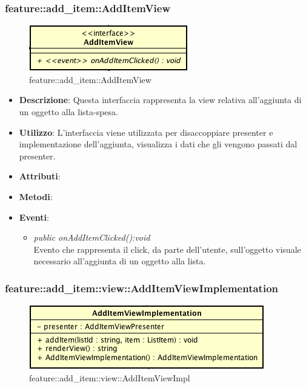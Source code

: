 \subsubsection{feature::add\_item::AddItemView}

\label{feature::add_item::AddItemView}
\begin{figure}[H]
	\centering
	\includegraphics[scale=0.5]{Sezioni/SottosezioniST/img/app/AddItemView.png}
	\caption{feature::add\_item::AddItemView}
\end{figure}

\begin{itemize}
\item \textbf{Descrizione}: Questa interfaccia rappresenta la view relativa all'aggiunta di un oggetto alla lista-spesa.
\item \textbf{Utilizzo}: L'interfaccia viene utilizzata per disaccoppiare presenter e implementazione dell'aggiunta, visualizza i dati che gli vengono passati dal presenter.
\item \textbf{Attributi}: 
\item \textbf{Metodi}:
\item \textbf{Eventi}:
	\begin{itemize}	
	\item \textit{public onAddItemClicked():void}\\
	Evento che rappresenta il click, da parte dell'utente, sull'oggetto visuale necessario all'aggiunta di un oggetto alla lista.
	\end{itemize}
\end{itemize}

\subsubsection{feature::add\_item::view::AddItemViewImplementation}

\label{feature::add_item::view::AddItemViewImpl}
\begin{figure}[H]
	\centering
	\includegraphics[scale=0.5]{Sezioni/SottosezioniST/img/app/AddItemViewImplementation.png}
	\caption{feature::add\_item::view::AddItemViewImpl}
\end{figure}

